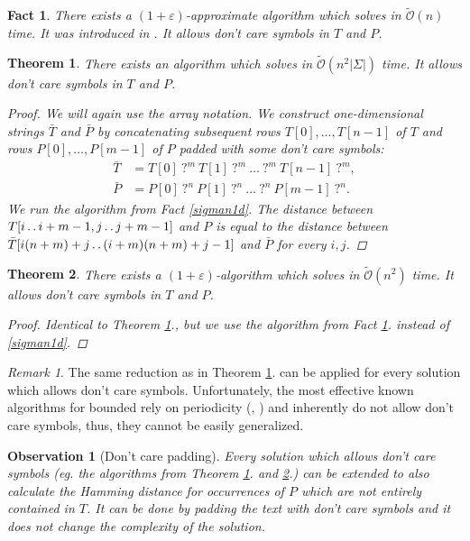 \documentclass[11pt]{article}
\def\dd{\mathinner{.\,.}}
\newcommand{\tO}{\tilde{\mathcal{O}}}
\newcommand{\eq}[1]{\begin{align*} #1 \end{align*}}
\theoremstyle{plain}
\newtheorem{theorem}{Theorem}
\newtheorem{fact}{Fact}
\newtheorem{observation}{Observation}
\theoremstyle{definition}
\theoremstyle{remark}
\newtheorem*{remark}{Remark}
\begin{document}
\begin{fact}\label{approx1d}
	There exists a $(1 + \varepsilon)$-approximate algorithm which solves \hd in $\tO(n)$ time.
	It was introduced in \cite{Karloff1993}.
	It allows don't care symbols in $T$ and $P$.
\end{fact}


\begin{theorem}\label{sigman2d}
	There exists an algorithm which solves \HD in $\tO(n^2|\Sigma|)$ time.
	It allows don't care symbols in $T$ and $P$.
	\begin{proof}
		We will again use the array notation.
		We construct one-dimensional strings $\bar{T}$ and $\bar{P}$ by concatenating subsequent rows $T[0], \dots, T[n - 1]$ of $T$ and rows $P[0], \dots, P[m - 1]$ of $P$ padded with some don't care symbols:
		\eq{
			\bar{T} &= T[0] \ \texttt{?}^{m} \ T[1] \ \texttt{?}^{m} \ \dots \ \texttt{?}^{m} \ T[n - 1] \ \texttt{?}^{m}, \\
			\bar{P} &= P[0] \ \texttt{?}^{n} \ P[1] \ \texttt{?}^{n} \ \dots \ \texttt{?}^{n} \ P[m - 1] \ \texttt{?}^{n}.
			}                                                                          
		We run the algorithm from Fact \ref{sigman1d}.
		The distance between $T[i \dd i + m - 1, j \dd j + m - 1]$ and $P$ is equal to the distance between $\bar{T}[i(n + m) + j \dd (i + m)(n + m) + j - 1]$ and $\bar{P}$ for every $i, j$.
	\end{proof}
\end{theorem}


\begin{theorem}\label{approx2d}
	There exists a $(1 + \varepsilon)$-algorithm which solves \HD in $\tO(n^2)$ time.
	It allows don't care symbols in $T$ and $P$.
	\begin{proof}
		Identical to Theorem \ref{sigman2d}., but we use the algorithm from Fact \ref{approx1d}. instead of \ref{sigman1d}.
	\end{proof}
\end{theorem}


\begin{remark}
	The same reduction as in Theorem \ref{sigman2d}. can be applied for every \hd solution which allows don't care symbols.
	Unfortunately, the most effective known algorithms for bounded \hd rely on periodicity (\cite{Clifford2015}, \cite{Gawrychowski2017}) and inherently do not allow don't care symbols, thus, they cannot be easily generalized.
\end{remark}


\begin{observation}[Don't care padding]
	Every \HD solution which allows don't care symbols (eg. the algorithms from Theorem \ref{sigman2d}. and \ref{approx2d}.) can be extended to also calculate the Hamming distance for occurrences of $P$ which are not entirely contained in $T$.
	It can be done by padding the text with don't care symbols and it does not change the complexity of the solution.
\end{observation}
\end{document}
